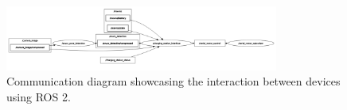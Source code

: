     \begin{figure}[H] 
        \centering 
        \includegraphics[width=0.8\textwidth]{pictures/complete_node_diagram.png} 
        \caption{Communication diagram showcasing the interaction between devices using ROS 2.} 
        \label{fig:communication_architecture} 
    \end{figure}

    




